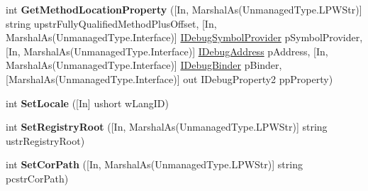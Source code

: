 \begin{DoxyCompactItemize}
\item 
\hypertarget{interface_microsoft_1_1_visual_studio_1_1_debugger_1_1_interop_e_e_1_1_i_debug_expression_evaluator2_a93236cf379f698d0ab8ca89974772c6e}{int {\bfseries Get\+Method\+Location\+Property} (\mbox{[}In, Marshal\+As(Unmanaged\+Type.\+L\+P\+W\+Str)\mbox{]} string upstr\+Fully\+Qualified\+Method\+Plus\+Offset, \mbox{[}In, Marshal\+As(Unmanaged\+Type.\+Interface)\mbox{]} \hyperlink{interface_microsoft_1_1_visual_studio_1_1_debugger_1_1_interop_e_e_1_1_i_debug_symbol_provider}{I\+Debug\+Symbol\+Provider} p\+Symbol\+Provider, \mbox{[}In, Marshal\+As(Unmanaged\+Type.\+Interface)\mbox{]} \hyperlink{interface_microsoft_1_1_visual_studio_1_1_debugger_1_1_interop_e_e_1_1_i_debug_address}{I\+Debug\+Address} p\+Address, \mbox{[}In, Marshal\+As(Unmanaged\+Type.\+Interface)\mbox{]} \hyperlink{interface_microsoft_1_1_visual_studio_1_1_debugger_1_1_interop_e_e_1_1_i_debug_binder}{I\+Debug\+Binder} p\+Binder, \mbox{[}Marshal\+As(Unmanaged\+Type.\+Interface)\mbox{]} out I\+Debug\+Property2 pp\+Property)}\label{interface_microsoft_1_1_visual_studio_1_1_debugger_1_1_interop_e_e_1_1_i_debug_expression_evaluator2_a93236cf379f698d0ab8ca89974772c6e}

\item 
\hypertarget{interface_microsoft_1_1_visual_studio_1_1_debugger_1_1_interop_e_e_1_1_i_debug_expression_evaluator2_a68a3642c793eaa22db9d6d43b3c868d3}{int {\bfseries Set\+Locale} (\mbox{[}In\mbox{]} ushort w\+Lang\+I\+D)}\label{interface_microsoft_1_1_visual_studio_1_1_debugger_1_1_interop_e_e_1_1_i_debug_expression_evaluator2_a68a3642c793eaa22db9d6d43b3c868d3}

\item 
\hypertarget{interface_microsoft_1_1_visual_studio_1_1_debugger_1_1_interop_e_e_1_1_i_debug_expression_evaluator2_a7e42fd45a4e5399430d80f2db436dfc2}{int {\bfseries Set\+Registry\+Root} (\mbox{[}In, Marshal\+As(Unmanaged\+Type.\+L\+P\+W\+Str)\mbox{]} string ustr\+Registry\+Root)}\label{interface_microsoft_1_1_visual_studio_1_1_debugger_1_1_interop_e_e_1_1_i_debug_expression_evaluator2_a7e42fd45a4e5399430d80f2db436dfc2}

\item 
\hypertarget{interface_microsoft_1_1_visual_studio_1_1_debugger_1_1_interop_e_e_1_1_i_debug_expression_evaluator2_ae0e14ac402e9f3275973f60022eef161}{int {\bfseries Set\+Cor\+Path} (\mbox{[}In, Marshal\+As(Unmanaged\+Type.\+L\+P\+W\+Str)\mbox{]} string pcstr\+Cor\+Path)}\label{interface_microsoft_1_1_visual_studio_1_1_debugger_1_1_interop_e_e_1_1_i_debug_expression_evaluator2_ae0e14ac402e9f3275973f60022eef161}


\end{DoxyCompactItemize}
